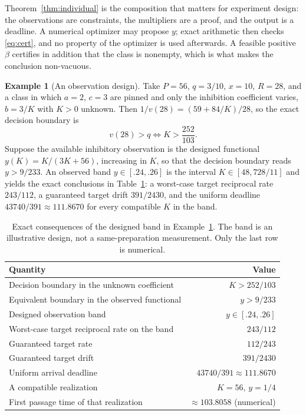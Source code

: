 \documentclass[11pt]{article}
\theoremstyle{definition}
\newtheorem{example}[theorem]{Example}
\begin{document}
Theorem~\ref{thm:individual} is the composition that matters for experiment
design: the observations are constraints, the multipliers are a proof, and the
output is a deadline. A numerical optimizer may propose $y$; exact arithmetic
then checks \eqref{eq:cert}, and no property of the optimizer is used
afterwards. A feasible positive $\beta$ certifies in addition that the class is
nonempty, which is what makes the conclusion non-vacuous.

\begin{example}[An observation design]\label{ex:design}
Take $P=56$, $q=3/10$, $x=10$, $R=28$, and a class in which $a=2$, $c=3$ are
pinned and only the inhibition coefficient varies, $b=3/K$ with $K>0$ unknown.
Then $1/v(28)=(59+84/K)/28$, so the exact decision boundary is
\[
  v(28)>q\iff K>\frac{252}{103}.
\]
Suppose the available inhibitory observation is the designed functional
$y(K)=K/(3K+56)$, increasing in $K$, so that the decision boundary reads
$y>9/233$. An observed band $y\in[.24,.26]$ is the interval
$K\in[48,728/11]$ and yields the exact conclusions in
Table~\ref{tab:design}: a worst-case target reciprocal rate $243/112$,
a guaranteed target drift $391/2430$, and the uniform deadline
$43740/391\approx111.8670$ for every compatible $K$ in the band.
\end{example}

\begin{table}[ht]
\centering
\begin{tabular}{@{}lr@{}}
\toprule
Quantity & Value\\
\midrule
Decision boundary in the unknown coefficient & $K>252/103$\\
Equivalent boundary in the observed functional & $y>9/233$\\
Designed observation band & $y\in[.24,.26]$\\
Worst-case target reciprocal rate on the band & $243/112$\\
Guaranteed target rate & $112/243$\\
Guaranteed target drift & $391/2430$\\
Uniform arrival deadline & $43740/391\approx111.8670$\\
A compatible realization & $K=56$, $y=1/4$\\
First passage time of that realization & $\approx103.8058$ (numerical)\\
\bottomrule
\end{tabular}
\caption{Exact consequences of the designed band in Example~\ref{ex:design}.
The band is an illustrative design, not a same-preparation measurement. Only
the last row is numerical.}\label{tab:design}
\end{table}
\end{document}
